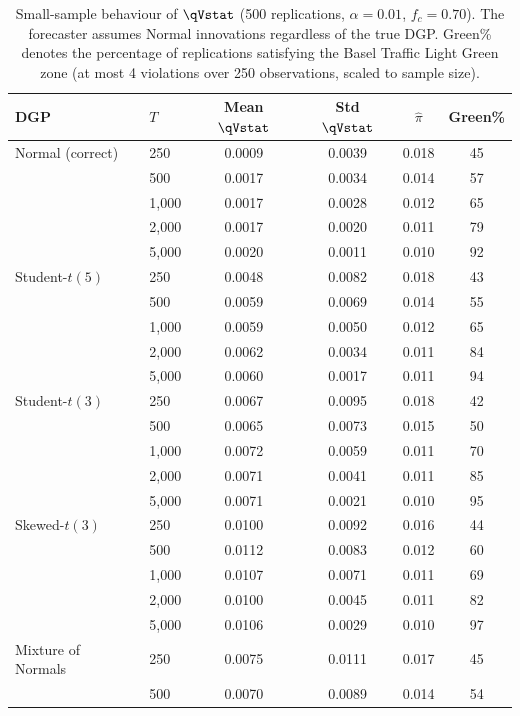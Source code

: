 \begin{table}[H]
	\centering
	\caption{Small-sample behaviour of $\qVstat$ (500 replications, $\alpha=0.01$, $f_c=0.70$). The forecaster assumes Normal innovations regardless of the true DGP. Green\% denotes the percentage of replications satisfying the Basel Traffic Light Green zone (at most 4 violations over 250 observations, scaled to sample size).}
	\label{tab:small_sample_qV}
	\footnotesize
	\begin{tabular}{@{}llcccc@{}}
		\hline\hline
		DGP & $T$ & Mean $\qVstat$ & Std $\qVstat$ & $\hat\pi$ & Green\% \\
		\hline
		Normal (correct)
		& 250   & 0.0009 & 0.0039 & 0.018 & 45 \\
		& 500   & 0.0017 & 0.0034 & 0.014 & 57 \\
		& 1,000   & 0.0017 & 0.0028 & 0.012 & 65 \\
		& 2,000   & 0.0017 & 0.0020 & 0.011 & 79 \\
		& 5,000   & 0.0020 & 0.0011 & 0.010 & 92 \\
		\addlinespace
		Student-$t(5)$
		& 250   & 0.0048 & 0.0082 & 0.018 & 43 \\
		& 500   & 0.0059 & 0.0069 & 0.014 & 55 \\
		& 1,000   & 0.0059 & 0.0050 & 0.012 & 65 \\
		& 2,000   & 0.0062 & 0.0034 & 0.011 & 84 \\
		& 5,000   & 0.0060 & 0.0017 & 0.011 & 94 \\
		\addlinespace
		Student-$t(3)$
		& 250   & 0.0067 & 0.0095 & 0.018 & 42 \\
		& 500   & 0.0065 & 0.0073 & 0.015 & 50 \\
		& 1,000   & 0.0072 & 0.0059 & 0.011 & 70 \\
		& 2,000   & 0.0071 & 0.0041 & 0.011 & 85 \\
		& 5,000   & 0.0071 & 0.0021 & 0.010 & 95 \\
		\addlinespace
		Skewed-$t(3)$
		& 250   & 0.0100 & 0.0092 & 0.016 & 44 \\
		& 500   & 0.0112 & 0.0083 & 0.012 & 60 \\
		& 1,000   & 0.0107 & 0.0071 & 0.011 & 69 \\
		& 2,000   & 0.0100 & 0.0045 & 0.011 & 82 \\
		& 5,000   & 0.0106 & 0.0029 & 0.010 & 97 \\
		\addlinespace
		Mixture of Normals
		& 250   & 0.0075 & 0.0111 & 0.017 & 45 \\
		& 500   & 0.0070 & 0.0089 & 0.014 & 54 \\

\end{tabular}
\end{table}
